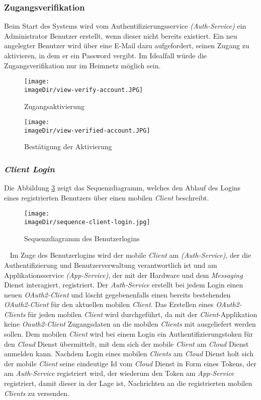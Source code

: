 \subsubsection{Zugangsverifikation}
Beim Start des Systems wird vom Authentifizierungsservice \emph{(Auth-Service)} ein Administrator Benutzer erstellt, wenn dieser nicht bereits existiert. Ein neu angelegter Benutzer wird über eine E-Mail dazu aufgefordert, seinen Zugang zu aktivieren, in dem er ein Password vergibt. Im Idealfall würde die Zugangsverifikation nur im Heimnetz möglich sein.
\begin{figure}[h]
	\centering
	\texttt{[image: \\imageDir/view-verify-account.JPG]}
	\caption{Zugangsaktivierung}
	\label{fig:image-veriy-account}
\end{figure}
\begin{figure}[h]
	\centering
	\texttt{[image: \\imageDir/view-verified-account.JPG]}
	\caption{Bestätigung der Aktivierung}
	\label{fig:image-veriied-account}
\end{figure}

\subsubsection{\emph{Client Login}}
Die Abbildung \ref{fig:image-sequence-client-login} zeigt das Sequenzdiagramm, welches den Ablauf des Logins eines registrierten Benutzers über einen mobilen \emph{Client} beschreibt.
\begin{figure}[h]
	\centering
	\texttt{[image: \\imageDir/sequence-client-login.jpg]}
	\caption{Sequenzdiagramm des Benutzerlogins}
	\label{fig:image-sequence-client-login}
\end{figure}
\ \newpage
Im Zuge des Benutzerlogins wird der mobile \emph{Client} am \emph{(Auth-Service)}, der die Authentifizierung und Benutzerverwaltung verantwortlich ist und am Applikationsservice \emph{(App-Service)}, der mit der Hardware und dem \emph{Messaging} Dienst interagiert, registriert. Der \emph{Auth-Service} erstellt bei jedem Login einen neuen \emph{OAuth2-Client} und löscht gegebenenfalls einen bereits bestehenden  \emph{OAuth2-Client} für den aktuellen mobilen \emph{Client}. Das Erstellen eines \emph{OAuth2-Clients} für jeden mobilen \emph{Client} wird durchgeführt, da mit der \emph{Client}-Applikation keine \emph{Oauth2-Client} Zugangsdaten an die mobilen \emph{Clients} mit ausgeliefert werden sollen.
\newline
\newline
Dem mobilen \emph{Client} wird bei einem Login ein Authentifizierungstoken für den \emph{Cloud} Dienst übermittelt, mit dem sich der mobile \emph{Client} am \emph{Cloud} Dienst anmelden kann. Nachdem Login eines mobilen \emph{Clients} am \emph{Cloud} Dienst holt sich der mobile \emph{Client} seine eindeutige Id vom \emph{Cloud} Dienst in Form eines Tokens, der am \emph{Auth-Service} registriert wird, der wiederum den Token am \emph{App-Service} registriert, damit dieser in der Lage ist, Nachrichten an die registrierten mobilen \emph{Clients} zu versenden.  

